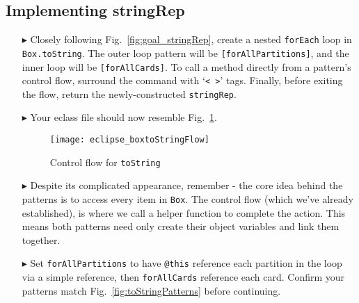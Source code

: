 \newpage
\hypertarget{stringRep tex}{}
\subsection{Implementing stringRep}
\texHeader

\vspace{0.5cm}

\begin{itemize}
  
\item[$\blacktriangleright$] Closely following Fig.~\ref{fig:goal_stringRep}, create a nested \texttt{forEach} loop in \texttt{Box.toString}. The outer loop
pattern will be \texttt{[forAllPartitions]}, and the inner loop will be \texttt{[forAllCards]}. To call a method directly from a pattern's control flow,
surround the command with `\texttt{< >}' tags. Finally, before exiting the flow, return the newly-constructed \texttt{stringRep}.

\vspace{0.5cm}

\item[$\blacktriangleright$] Your eclass file should now resemble Fig.~\ref{fig:toStringFlow}.

\vspace{0.5cm}

\begin{figure}[htp]
\begin{center}
  \texttt{[image: eclipse\_boxtoStringFlow]}
  \caption{Control flow for \texttt{toString}}
  \label{fig:toStringFlow}
\end{center}
\end{figure}

\vspace{0.5cm}

\item[$\blacktriangleright$] Despite its complicated appearance, remember - the core idea behind the patterns is to access every item in \texttt{Box}. The
control flow (which we've already established), is where we call a helper function to complete the action. This means both patterns need only create their
object variables and link them together.

\item[$\blacktriangleright$] Set \texttt{forAllPartitions} to have \texttt{@this} reference each partition in the loop via a simple reference, then
\texttt{forAllCards} reference each card. Confirm your patterns match Fig.~\ref{fig:toStringPatterns} before continuing.


\end{itemize}
